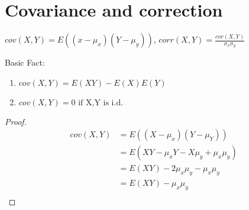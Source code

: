 \documentclass[a4paper]{article}
\begin{document}
\section*{Covariance and correction}
\begin{definition}
    $cov (X,Y)=E((x-\mu_{x})(Y-\mu_{y}))$, $corr (X,Y)=\frac{cov (X,Y)}{\sigma_{x}\sigma_{y}} $
\end{definition}

Basic Fact:
\begin{enumerate}
    \item $cov (X,Y)=E(XY)-E(X)E(Y) $
    \item $cov (X,Y)=0 \text{ if X,Y is i.d.}$
    
\end{enumerate}
\begin{proof}
    \begin{align*}
        cov (X,Y)&= E((X-\mu_{x}) (Y-\mu_{Y})) \\
        &= E(XY-\mu_{x}Y-X\mu_{y}+\mu_{x}\mu_{y}) \\
        &= E( XY )-2 \mu_{x}\mu_{y}-\mu_{x}\mu_{y}\\
        &= E( XY )  -\mu_{x}\mu_{y} \\
    \end{align*}
\end{proof}
\end{document}
